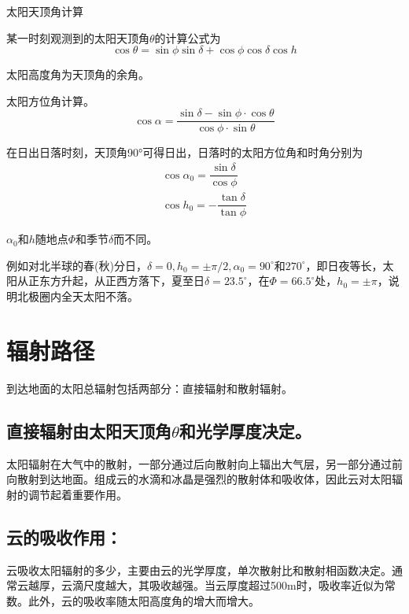 \documentclass[UTF8,a4paper,11pt,oneside]{ctexbook}
\begin{document}
太阳天顶角计算

某一时刻观测到的太阳天顶角\(\theta\)的计算公式为
\begin{equation}
\cos{}\theta=\sin{}\phi\sin{}\delta+\cos{}\phi\cos{}\delta\cos{}h
\end{equation}

太阳高度角为天顶角的余角。

太阳方位角计算。
\begin{equation}
\cos{}\alpha=\dfrac{\sin{}\delta-\sin{}\phi\cdot\cos{}\theta}{\cos{}\phi\cdot\sin{}\theta}
\end{equation}

在日出日落时刻，天顶角90°可得日出，日落时的太阳方位角和时角分别为
\begin{gather}
    \cos{}\alpha_0=\dfrac{\sin{}\delta}{\cos{}\phi}\\
    \cos{}h_0=-\dfrac{\tan{}\delta}{\tan{}\phi}
\end{gather}

\(\alpha_0\)和\(h\)随地点\(\Phi\)和季节\(\delta\)而不同。

例如对北半球的春(秋)分日，\(\delta=0,h_0=\pm\pi/2,\alpha_0=90^\circ\text{和}270^\circ\)，即日夜等长，太阳从正东方升起，从正西方落下，夏至日\(\delta=23.5^\circ\)，在\(\Phi=66.5^\circ\)处，\(h_0=\pm{}\pi\)，说明北极圈内全天太阳不落。

\section{辐射路径}

到达地面的太阳总辐射包括两部分：直接辐射和散射辐射。

\subsection{直接辐射由太阳天顶角\(\theta\)和光学厚度决定。}

太阳辐射在大气中的散射，一部分通过后向散射向上辐出大气层，另一部分通过前向散射到达地面。组成云的水滴和冰晶是强烈的散射体和吸收体，因此云对太阳辐射的调节起着重要作用。

\subsection{云的吸收作用：}

云吸收太阳辐射的多少，主要由云的光学厚度，单次散射比和散射相函数决定。通常云越厚，云滴尺度越大，其吸收越强。当云厚度超过500m时，吸收率近似为常数。此外，云的吸收率随太阳高度角的增大而增大。
\end{document}
